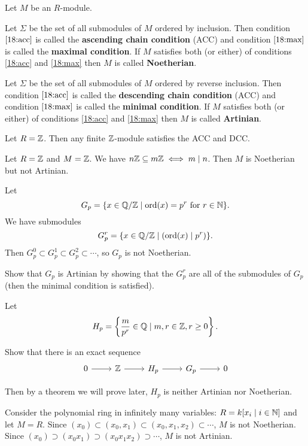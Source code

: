 \begin{defn}
  Let $M$ be an $R$-module.
  \begin{enum}
    \io
    Let $\Sigma$ be the set of all submodules of $M$ ordered by inclusion.
    Then condition $\ref{18:acc}$ is called the \textbf{ascending chain condition} (ACC) and condition $\ref{18:max}$ is called the \textbf{maximal condition}.
    If $M$ satisfies both (or either) of conditions \ref{18:acc} and \ref{18:max} then $M$ is called \textbf{Noetherian}.

    \io
    Let $\Sigma$ be the set of all submodules of $M$ ordered by reverse inclusion.
    Then condition $\ref{18:acc}$ is called the \textbf{descending chain condition} (ACC) and condition $\ref{18:max}$ is called the \textbf{minimal condition}.
    If $M$ satisfies both (or either) of conditions \ref{18:acc} and \ref{18:max} then $M$ is called \textbf{Artinian}.
  \end{enum}
\end{defn}

\begin{exam}
  \leavevmode
  \begin{enum}
    \io
    Let $R=\mathbb{Z}$.
    Then any finite $\mathbb{Z}$-module satisfies the ACC and DCC.

    \io
    Let $R=\mathbb{Z}$ and $M=\mathbb{Z}$.
    We have $n\mathbb{Z} \subseteq m\mathbb{Z} \iff m \mid n$.
    Then $M$ is Noetherian but not Artinian.

    \io
    Let
    \[ G_p = \{x \in \mathbb{Q}/\mathbb{Z} \mid \operatorname{ord}(x) = p^r \text{ for } r \in \mathbb{N}\}. \]
    We have submodules
    \[ G_p^r = \{x \in \mathbb{Q}/\mathbb{Z} \mid (\operatorname{ord}(x) \mid p^r) \}. \]
    Then $G_p^0 \subset G_p^1 \subset G_p^2 \subset \cdots$, so $G_p$ is not Noetherian.

    \begin{exer}
      Show that $G_p$ is Artinian by showing that the $G_p^r$ are all of the submodules of $G_p$ (then the minimal condition is satisfied).
    \end{exer}

    \io
    Let
    \[ H_p = \left\{ \frac{m}{p^r} \in \mathbb{Q} \mid m,r \in \mathbb{Z}, r \geq 0 \right\}. \]

    \begin{exer}
      Show that there is an exact sequence
      \begin{equation*}
	\begin{tikzcd}
	  0 \ar[r] & \ZZ \ar[r] & H_p \ar[r] & G_p \ar[r] & 0
	\end{tikzcd}
      \end{equation*}
    \end{exer}
    Then by a theorem we will prove later, $H_p$ is neither Artinian nor Noetherian.
  \end{enum}

  \io
  Consider the polynomial ring in infinitely many variables: $R = k[x_i \mid i \in \mathbb{N}]$ and let $M=R$.
  Since $(x_0) \subset (x_0,x_1) \subset (x_0,x_1,x_2) \subset \cdots$, $M$ is not Noetherian.
  Since $(x_0) \supset (x_0x_1) \supset (x_0x_1x_2) \supset \cdots$, $M$ is not Artinian.
\end{exam}

